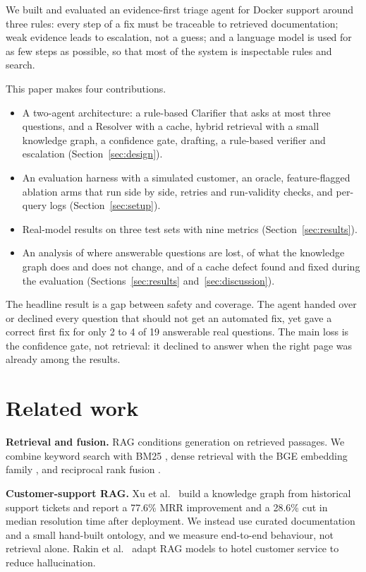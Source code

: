 \documentclass[cameraready]{ieeeconf}
\begin{document}
We built and evaluated an evidence-first triage agent for Docker support around three rules: every step of a fix must be traceable to retrieved documentation; weak evidence leads to escalation, not a guess; and a language model is used for as few steps as possible, so that most of the system is inspectable rules and search.

This paper makes four contributions.
\begin{itemize}
\item A two-agent architecture: a rule-based Clarifier that asks at most three questions, and a Resolver with a cache, hybrid retrieval with a small knowledge graph, a confidence gate, drafting, a rule-based verifier and escalation (Section~\ref{sec:design}).
\item An evaluation harness with a simulated customer, an oracle, feature-flagged ablation arms that run side by side, retries and run-validity checks, and per-query logs (Section~\ref{sec:setup}).
\item Real-model results on three test sets with nine metrics (Section~\ref{sec:results}).
\item An analysis of where answerable questions are lost, of what the knowledge graph does and does not change, and of a cache defect found and fixed during the evaluation (Sections~\ref{sec:results} and~\ref{sec:discussion}).
\end{itemize}

The headline result is a gap between safety and coverage. The agent handed over or declined every question that should not get an automated fix, yet gave a correct first fix for only 2 to 4 of 19 answerable real questions. The main loss is the confidence gate, not retrieval: it declined to answer when the right page was already among the results.

\section{Related work}
\textbf{Retrieval and fusion.} RAG \cite{lewis2020rag} conditions generation on retrieved passages. We combine keyword search with BM25 \cite{robertson2009bm25}, dense retrieval with the BGE embedding family \cite{xiao2023cpack}, and reciprocal rank fusion \cite{cormack2009rrf}.

\textbf{Customer-support RAG.} Xu et al.\ \cite{xu2024kgrag} build a knowledge graph from historical support tickets and report a 77.6\% MRR improvement and a 28.6\% cut in median resolution time after deployment. We instead use curated documentation and a small hand-built ontology, and we measure end-to-end behaviour, not retrieval alone. Rakin et al.\ \cite{rakin2024domain} adapt RAG models to hotel customer service to reduce hallucination.
\end{document}
